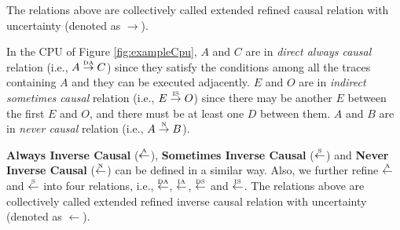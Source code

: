 \documentclass{llncs}
\begin{document}
The relations above are collectively called extended refined causal relation with uncertainty (denoted as $\rightarrow$).

\begin{example}\label{ex:causalRelation}
In the CPU of Figure \ref{fig:exampleCpu}, $A$ and $C$ are in \textit{direct always causal} relation (i.e., $A\overset{\text{\tiny{DA}}}{\rightarrow}C$) since they satisfy the conditions among all the traces containing $A$ and they can be executed adjacently. $E$ and $O$ are in \textit{indirect sometimes causal} relation (i.e., $E\overset{\text{\tiny{IS}}}{\rightarrow}O$) since there may be another $E$ between the first $E$ and $O$, and there must be at least one $D$ between them. $A$ and $B$ are in \textit{never causal} relation (i.e., $A\overset{\text{\tiny{N}}}{\rightarrow} B$).
\end{example}

\textbf{Always Inverse Causal} ($\overset{\text{\tiny{A}}}{\leftarrow}$), \textbf{Sometimes Inverse Causal} ($\overset{\text{\tiny{S}}}{\leftarrow}$) and \textbf{Never Inverse Causal} ($\overset{\text{\tiny{N}}}{\leftarrow}$) can be defined in a similar way. Also, we further refine $\overset{\text{\tiny{A}}}{\leftarrow}$ and $\overset{\text{\tiny{S}}}{\leftarrow}$ into four relations, i.e., $\overset{\text{\tiny{DA}}}{\leftarrow}$, $\overset{\text{\tiny{IA}}}{\leftarrow}$, $\overset{\text{\tiny{DS}}}{\leftarrow}$ and $\overset{\text{\tiny{IS}}}{\leftarrow}$. The relations above are collectively called extended refined inverse causal relation with uncertainty (denoted as $\leftarrow$).


\end{document}
